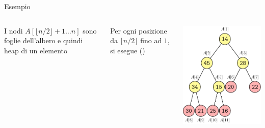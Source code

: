\begin{frame}{Esempio}

\small
\begin{columns}[T]
\BIL
\item I nodi $A[\lfloor n/2 \rfloor+1 \ldots n]$ sono foglie dell'albero 
e quindi heap di un elemento 
\item Per ogni posizione da $\lfloor n/2 \rfloor$ fino ad $1$, si esegue \maxheapify()
\EIL
{}
\vspace{-12pt}
\begin{overprint}
\includegraphics[width=\textwidth,page=1]{heapbuild.pdf}

\end{overprint}
\end{columns}
\end{frame}
